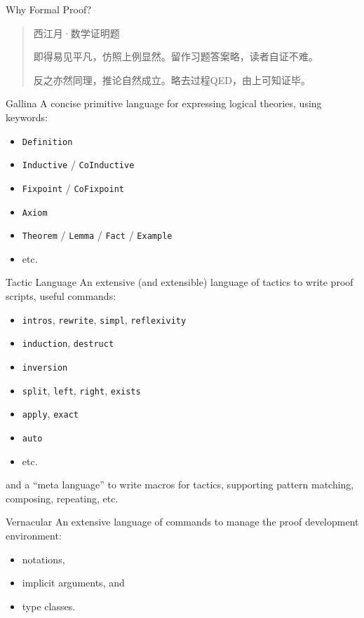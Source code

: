 \documentclass[usenames,xcolor=svgnames,11pt,sans,aspectratio=169]{beamer}
\let\t\texttt
\begin{document}
\begin{frame}{Why Formal Proof?}
  \linespread{1.8}
  \begin{quote}
    \begin{center}
      西江月·数学证明题
    \end{center}
    
    即得易见平凡，仿照上例显然。留作习题答案略，读者自证不难。
    
    反之亦然同理，推论自然成立。略去过程QED，由上可知证毕。

  \end{quote}
\end{frame}

\begin{frame}{Gallina}
  A concise primitive language for expressing logical theories, using keywords:
  \begin{itemize}
    \item \t{Definition}
    \item \t{Inductive} / \t{CoInductive}
    \item \t{Fixpoint} / \t{CoFixpoint}
    \item \t{Axiom}
    \item \t{Theorem} / \t{Lemma} / \t{Fact} / \t{Example}
    \item etc.
  \end{itemize}
\end{frame}

\begin{frame}{Tactic Language}
  An extensive (and extensible) language of tactics to write proof scripts, useful commands:
  \begin{itemize}
    \item \t{intros}, \t{rewrite}, \t{simpl}, \t{reflexivity}
    \item \t{induction}, \t{destruct}
    \item \t{inversion}
    \item \t{split}, \t{left}, \t{right}, \t{exists}
    \item \t{apply}, \t{exact}
    \item \t{auto}
    \item etc.
  \end{itemize}
  and a ``meta language'' to write macros for tactics, supporting pattern matching, composing,
  repeating, etc.
\end{frame}

\begin{frame}{Vernacular}
  An extensive language of commands to manage the proof development environment:
  \begin{itemize}
    \item notations,
    \item implicit arguments, and
    \item type classes.
  \end{itemize}
\end{frame}
\end{document}
